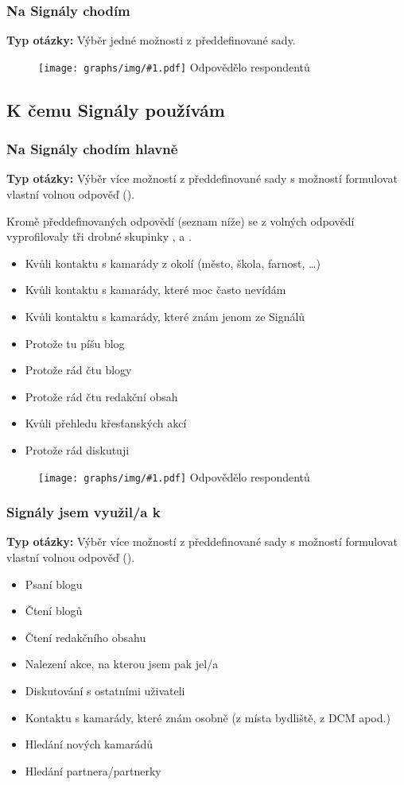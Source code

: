 \documentclass[12pt, a4paper, twoside]{article}
\newcommand{\answercount}[1]{Odpovědělo  respondentů}
\newcommand{\includegraph}[2]{
  \begin{figure}[H]
    \centering
    \textbf{#2}
    \texttt{[image: graphs/img/\#1.pdf]}
    \answercount{#1}
  \end{figure}
}
\newcommand{\qtype}{\textbf{Typ otázky:}
}
\newcommand{\pickOne}{Výběr jedné možnosti z předdefinované sady}
\newcommand{\pickMultiple}{Výběr více možností z předdefinované sady}
\newcommand{\withOther}{s možností formulovat vlastní volnou odpověď (\uv{Jiné})}
\begin{document}
\subsubsection{Na Signály chodím}

\qtype \pickOne.

\includegraph{na_signaly_chodim}{}

\subsection{K čemu Signály používám}\label{sec:kcemu}

\subsubsection{Na Signály chodím hlavně}

\qtype \pickMultiple
\withOther.

Kromě předdefinovaných odpovědí (seznam níže)
se z volných odpovědí vyprofilovaly tři drobné skupinky
,  a .

\begin{itemize}
\item Kvůli kontaktu s kamarády z okolí (město, škola, farnost, …)
\item Kvůli kontaktu s kamarády, které moc často nevídám
\item Kvůli kontaktu s kamarády, které znám jenom ze Signálů
\item Protože tu píšu blog
\item Protože rád čtu blogy
\item Protože rád čtu redakční obsah
\item Kvůli přehledu křesťanských akcí
\item Protože rád diskutuji
\end{itemize}

\includegraph{na_signaly_chodim_hlavne}{}

\subsubsection{Signály jsem využil/a k}

\qtype \pickMultiple
\withOther.

\begin{itemize}
\item Psaní blogu
\item Čtení blogů
\item Čtení redakčního obsahu
\item Nalezení akce, na kterou jsem pak jel/a
\item Diskutování s ostatními uživateli
\item Kontaktu s kamarády, které znám osobně (z místa bydliště, z DCM apod.)
\item Hledání nových kamarádů
\item Hledání partnera/partnerky
\end{itemize}
\end{document}

